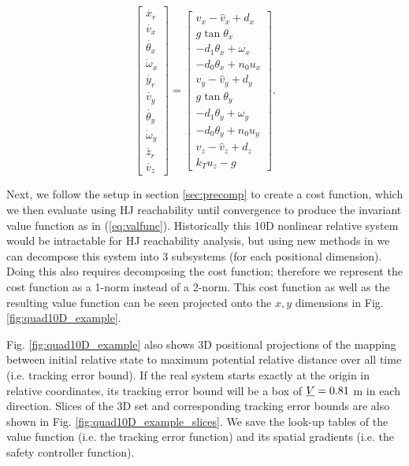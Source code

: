 \begin{equation}
\label{eq:Quad10DRel_dyn}
\begin{bmatrix}
\dot{x_r}\\
\dot{v_{x}}\\
\dot{\theta_{x}}\\
\dot\omega_{x}\\
\dot{y_r}\\
\dot{v_{y}}\\
\dot{\theta_{y}}\\
\dot\omega_{y}\\
\dot{z_r}\\
\dot{v_{z}}
\end{bmatrix} =
\begin{bmatrix}
v_x - \hat v_x + d_x\\
g \tan \theta_x\\
-d_1 \theta_x + \omega_x\\
-d_0 \theta_x + n_0 u_x\\
v_y - \hat v_y + d_y\\
g \tan \theta_y\\
-d_1 \theta_y + \omega_y\\
-d_0 \theta_y + n_0 u_y\\
v_z - \hat v_z + d_z\\
k_T u_z - g
\end{bmatrix}.
\end{equation}

Next, we follow the setup in section \ref{sec:precomp} to create a cost function, which we then evaluate using HJ reachability until convergence to produce the invariant value function as in (\ref{eq:valfunc}). Historically this 10D nonlinear relative system would be intractable for HJ reachability analysis, but using new methods in \cite{Chen2016DecouplingExact, Chen2016DecouplingJournal} we can decompose this system into 3 subsystems (for each positional dimension). Doing this also requires decomposing the cost function; therefore we represent the cost function as a 1-norm instead of a 2-norm. This cost function as well as the resulting value function can be seen projected onto the $x,y$ dimensions in Fig. \ref{fig:quad10D_example}.

Fig. \ref{fig:quad10D_example} also shows 3D positional projections of the mapping between initial relative state to maximum potential relative distance over all time (i.e. tracking error bound). If the real system starts exactly at the origin in relative coordinates, its tracking error bound will be a box of $\underline{V} = 0.81$ m in each direction. Slices of the 3D set and corresponding tracking error bounds are also shown in Fig. \ref{fig:quad10D_example_slices}. We save the look-up tables of the value function (i.e. the tracking error function) and its spatial gradients (i.e. the safety controller function).

